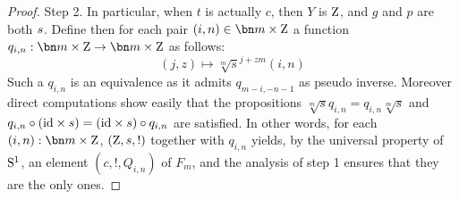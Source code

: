 \begin{proof}
  {\sc Step 2.} In particular, when $t$ is actually $c$, then $Y$ is $\mathrm{Z}$, and $g$
  and $p$ are both ${s}$. Define then for each pair
  $(i,n)\in\bn m \times \zet$ a function
  $q_{i,n}:\bn m\times\zet \to \bn m\times\zet$ as follows:
  \begin{displaymath}
    (j,z) \mapsto \sqrt[m]s^{j+zm}(i,n)%
  \end{displaymath}
  Such a $q_{i,n}$ is an equivalence as it admits $q_{m-i,-n-1}$ as
  pseudo inverse. Moreover direct computations show easily that the
  propositions $\sqrt[m] s q_{i,n} = q_{i,n}\sqrt[m] s$ and
  $q_{i,n} \circ (\mathord{\mathrm{id}} \times s) = (\mathord{\mathrm{id}} \times s) \circ q_{i,n}$ are
  satisfied. In other words, for each $(i,n):\bn m \times \zet$,
  $(\mathrm{Z},{s},!)$ together with $q_{i,n}$ yields, by the universal
  property of ${\mathrm{S}^1}$, an element $(c,!,Q_{i,n})$ of $F_m$, and the
  analysis of step 1 ensures that they are the only ones.


\end{proof}
